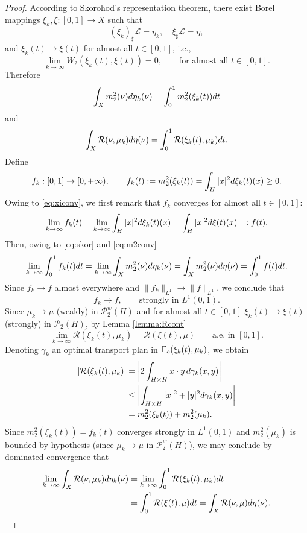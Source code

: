 \documentclass[10pt,a4paper]{amsart}
\renewcommand{\P}{\mathcal{P}}
\newcommand{\X}{\mathcal{P}_2(H)}
\renewcommand{\d}{{\rm d}}
\begin{document}
\begin{proof}
According to Skorohod's representation theorem, there exist Borel mappings $\xi_k,\xi : [0,1] \to X$ such that
\[
	(\xi_k)_\sharp \mathcal L = \eta_k,\quad 	\xi_\sharp \mathcal L = \eta,
\]
and $\xi_k(t) \to 	\xi(t)$ for almost all $t\in[0,1]$, i.e., 
\begin{equation}
\label{eq:xiconv}
	\lim_{k \to \infty} W_2(\xi_k(t),\xi(t)) =0,\qquad \text{for almost all }t\in[0,1].
\end{equation}
Therefore
\begin{equation}
\label{eq:skor}
	\int_{X} m_2^2(\nu) \d\eta_k(\nu) = \int_0^1 m_2^2(\xi_k(t)) \d t
\end{equation}
and
\[
	\int_{X} \mathcal R(\nu,\mu_k) \d\eta(\nu) = \int_0^1 \mathcal R(\xi_k(t),\mu_k) \d t.
\]
Define
\[
	f_k:[0,1]\to [0,+\infty),\qquad f_k(t) := m_2^2(\xi_k(t))=  \int_H |x|^2\d \xi_k(t)(x) \geq 0.
\]
Owing to \eqref{eq:xiconv}, we first remark that $f_k$ converges for almost all $t\in [0,1]$:
\[
	\lim_{k \to \infty} f_k(t) = \lim_{k \to \infty}  \int_H |x|^2\d \xi_k(t)(x) = \int_H |x|^2\d \xi(t)(x)= :f(t).
\]
Then, owing to \eqref{eq:skor} and \eqref{eq:m2conv} 
\[
	\lim_{k \to \infty} \int_0^1 f_k(t)\d t  = \lim_{k \to \infty} \int_{X} m_2^2(\nu) \d\eta_k(\nu) = \int_{X} m_2^2(\nu) \d\eta(\nu) = \int_0^1 f(t)\d t.
\]	
Since $f_k \to f$ almost everywhere and $\|f_k\|_{L^1} \to \|f\|_{L^1}$, we conclude that 
\begin{equation}
\label{eq:L1} %
	f_k \to f,\qquad \text{strongly in }L^1(0,1).
\end{equation}	
Since $\mu_k \to \mu$ (weakly) in $\P_2^w(H)$ and for almost all $t\in [0,1]$ $\xi_k(t) \to \xi(t)$ (strongly) in $\X$, by Lemma \ref{lemma:Rcont}
\[
	\lim_{k \to \infty} \mathcal R(\xi_k(t),\mu_k) = \mathcal R(\xi(t),\mu)\qquad \text{a.e. in }[0,1].
\]
Denoting $\gamma_k$ an optimal transport plan in $\Gamma_{\rm o}(\xi_k(t),\mu_k)$, we obtain
\begin{align*}
	|\mathcal R(\xi_k(t),\mu_k) | &= \left| 2\int_{H \times H} x\cdot y\, \d\gamma_k(x,y)\right | \\
		&\leq \left| \int_{H \times H} |x|^2+|y|^2 \d\gamma_k(x,y)\right | \\
		&=  m_2^2(\xi_k(t)) + m_2^2(\mu_k).
\end{align*}	
Since $m_2^2(\xi_k(t))=f_k(t)$ converges strongly in $L^1(0,1)$ and $m_2^2(\mu_k)$ is bounded by hypothesis (since $\mu_k \to \mu$ in $\P_2^w(H)$), we may conclude by dominated convergence that
\begin{align*}
    \lim_{k \to \infty}  \int_X \mathcal{R}(\nu,\mu_k) \d \eta_k(\nu) & = \lim_{k \to \infty} \int_0^1 \mathcal{R}(\xi_k(t),\mu_k) \d t \\
    & = \int_0^1 \mathcal{R}(\xi(t),\mu) \d t = \int_X \mathcal{R}(\nu,\mu) \d \eta(\nu).
\end{align*}
\end{proof}
\end{document}
